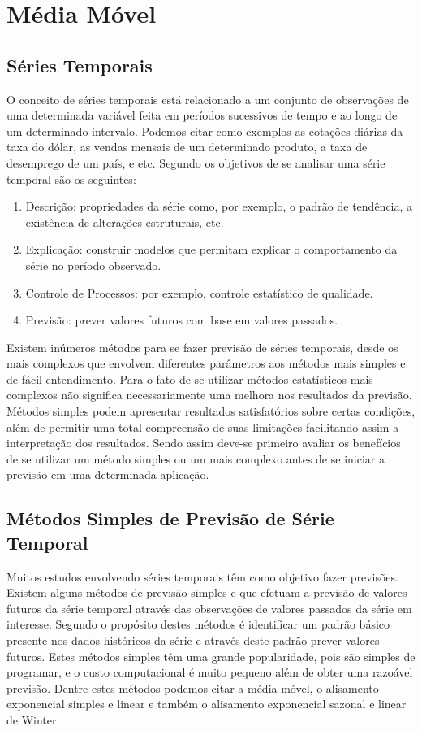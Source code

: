 \chapter{Média Móvel}
\label{Anexo:MM}
 \section{Séries Temporais}


O conceito de séries temporais está relacionado a um conjunto de observações de uma determinada variável feita em períodos sucessivos de tempo e ao longo de um determinado intervalo. Podemos citar como exemplos as cotações diárias da taxa do dólar, as vendas mensais de um determinado produto, a taxa de desemprego de um país, e etc. Segundo  os objetivos de se analisar uma série temporal são os seguintes: 

\begin{enumerate}
\item Descrição: propriedades da série como, por exemplo, o padrão de tendência, a existência de alterações estruturais, etc. 
\item Explicação: construir modelos que permitam explicar o comportamento da série no período observado. 
\item Controle de Processos: por exemplo, controle estatístico de qualidade. 
\item Previsão: prever valores futuros com base em valores passados. 
\end{enumerate}

Existem inúmeros métodos para se fazer previsão de séries temporais, desde os mais complexos que envolvem diferentes parâmetros aos métodos mais simples e de fácil entendimento. Para  o fato de se utilizar métodos estatísticos mais complexos não significa necessariamente uma melhora nos resultados da previsão. Métodos simples podem apresentar resultados satisfatórios sobre certas condições, além de permitir uma total compreensão de suas limitações facilitando assim a interpretação dos resultados. Sendo assim deve-se primeiro avaliar os benefícios de se utilizar um método simples ou um mais complexo antes de se iniciar a previsão em uma determinada aplicação.

\section{Métodos Simples de Previsão de Série Temporal}

Muitos estudos envolvendo séries temporais têm como objetivo fazer previsões. Existem alguns métodos de previsão simples e que efetuam a previsão de valores futuros da série temporal através das observações de valores passados da série em interesse. Segundo  o propósito destes métodos é identificar um padrão básico presente nos dados históricos da série e através deste padrão prever valores futuros.
Estes métodos simples têm uma grande popularidade, pois são simples de programar, e o custo computacional é muito pequeno além de obter uma razoável previsão. Dentre estes métodos podemos citar a média móvel, o alisamento exponencial simples e linear e também o alisamento exponencial sazonal e linear de Winter.

